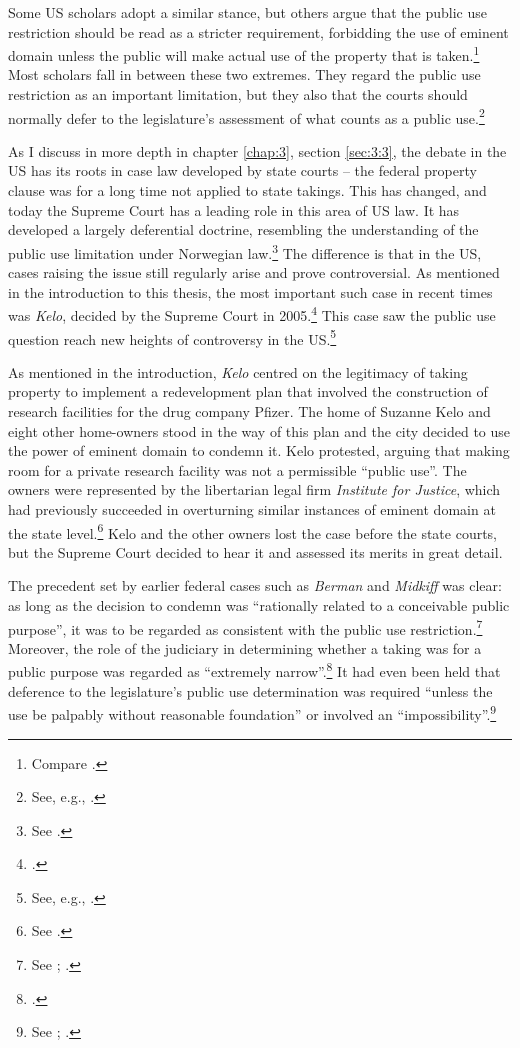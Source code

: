 Some US scholars adopt a similar stance, but others argue that the public use restriction should be read as a stricter requirement, forbidding the use of eminent domain unless the public will make actual use of the property that is taken.\footnote{Compare \cite{bell06,bell09,claeys04,sandefur06}.} Most scholars fall in between these two extremes. They regard the public use restriction as an important limitation, but they also  that the courts should normally defer to the legislature's assessment of what counts as a public use.\footnote{See, e.g., \cite{merrill86,alexander05}.}

As I discuss in more depth in chapter \ref{chap:3}, section \ref{sec:3:3}, the debate in the US has its roots in case law developed by state courts -- the federal property clause was for a long time not applied to state takings. This has changed, and today the Supreme Court has a leading role in this area of US law. It has developed a largely deferential doctrine, resembling the understanding of the public use limitation under Norwegian law.\footnote{See \cite{berman54,midkiff84,kelo05}.} The difference is that in the US, cases raising the issue still regularly arise and prove controversial. As mentioned in the introduction to this thesis, the most important such case in recent times was {\it Kelo}, decided by the Supreme Court in 2005.\footcite{kelo05} This case saw the public use question reach new heights of controversy in the US.\footnote{See, e.g., \cite{somin09}.}

As mentioned in the introduction, {\it Kelo} centred on the legitimacy of taking property to implement a redevelopment plan that involved the construction of research facilities for the drug company Pfizer. The home of Suzanne Kelo and eight other home-owners stood in the way of this plan and the city decided to use the power of eminent domain to condemn it. Kelo protested, arguing that making room for a private research facility was not a permissible ``public use''. The owners were represented by the libertarian legal firm {\it Institute for Justice}, which had previously succeeded in overturning similar instances of eminent domain at the state level.\footnote{See \cite{justice15}.} Kelo and the other owners lost the case before the state courts, but the Supreme Court decided to hear it and assessed its merits in great detail.

The precedent set by earlier federal cases such as {\it Berman} and {\it Midkiff} was clear: as long as the decision to condemn was ``rationally related to a conceivable public purpose'', it was to be regarded as consistent with the public use restriction.\footnote{See \cite[241]{midkiff84}; \cite{berman54}.} Moreover, the role of the judiciary in determining whether a taking was for a public purpose was regarded as ``extremely narrow''.\footcite[32]{berman54} It had even been held that deference to the legislature's public use determination was required ``unless the use be palpably without reasonable foundation'' or involved an ``impossibility''.\footnote{See \cite[66]{dominion25}; \cite[680]{gettysburg96}.}

